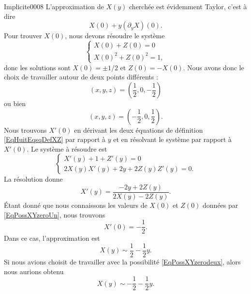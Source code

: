 \begin{corrige}{Implicite0008}
	L'approximation de $X(y)$ cherchée est évidemment Taylor, c'est à dire
	\begin{equation}
		X(0)+y(\partial_yX)(0).
	\end{equation}
	Pour trouver $X(0)$, nous devons résoudre le système
	\begin{equation}
		\left\{
		\begin{array}{ll}
			X(0)+Z(0)=0\\
			X(0)^2+Z(0)^2=1,
		\end{array}
		\right.
	\end{equation}
	donc les solutions sont $X(0)=\pm 1/2$ et $Z(0)=-X(0)$. Nous avons donc le choix de travailler autour de deux points différents :
	\begin{equation}		\label{EqPossXYzeroUn}
		(x,y,z)=(\frac{1}{ 2 },0,-\frac{1}{ 2 })
	\end{equation}
	ou bien
	\begin{equation}		\label{EqPossXYzerodeux}
		(x,y,z)=(-\frac{1}{ 2 },0,\frac{1}{ 2 }).
	\end{equation}
	Nous trouvons $X'(0)$ en dérivant les deux équations de définition \eqref{EqHuitEqsqDefXZ} par rapport à $y$ et en résolvant le système par rapport à $X'(0)$. Le système à résoudre est
	\begin{equation}
		\left\{
		\begin{array}{ll}
			X'(y)+1+Z'(y)=0\\
			2X(y)X'(y)+2y+2Z(y)Z'(y)=0.
		\end{array}
		\right.
	\end{equation}
	La résolution donne
	\begin{equation}
		X'(y)=\frac{ -2y+2Z(y) }{ 2X(y)-2Z(y) }.
	\end{equation}
	Étant donné que nous connaissons les valeurs de $X(0)$ et $Z(0)$ données par \eqref{EqPossXYzeroUn}, nous trouvons
	\begin{equation}
		X'(0)=-\frac{1}{ 2 }.
	\end{equation}
	Dans ce cas, l'approximation est
	\begin{equation}
		X(y)\sim \frac{ 1 }{2}-\frac{ 1 }{2}y.
	\end{equation}
	Si nous avions choisit de travailler avec la possibilité \eqref{EqPossXYzerodeux}, alors nous aurions obtenu
	\begin{equation}
		X(y)\sim -\frac{ 1 }{2}-\frac{ 1 }{2}y.
	\end{equation}

\end{corrige}
